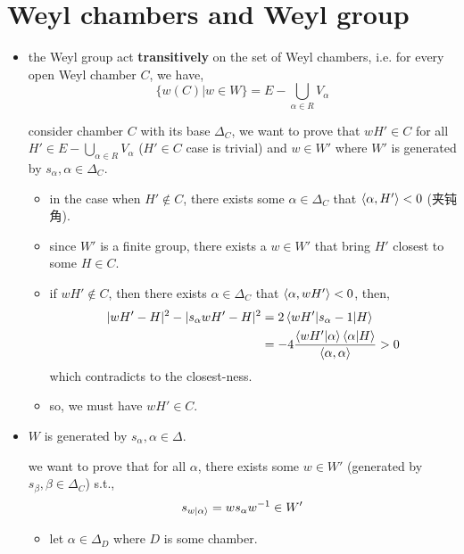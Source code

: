 \section{Weyl chambers and Weyl group} \label{7.5}
\begin{itemize}
	\item the Weyl group act \textbf{transitively} on the set of Weyl chambers, i.e. for every open Weyl chamber $C$, we have,
	\begin{equation}
		\{w(C) | w \in W\} = E - \bigcup_{\alpha \in R} V_\alpha
	\end{equation}
	
	\begin{tcolorbox}[title=proof:]
		consider chamber $C$ with its base $\Delta_C$, we want to prove that $w H' \in C$ for all $H' \in E - \bigcup_{\alpha \in R} V_\alpha$ ($H' \in C$ case is trivial) and $w \in W'$ where $W'$ is generated by $s_\alpha, \alpha \in \Delta_C$.
		\begin{itemize}
			\item in the case when $H' \notin C$, there exists some $\alpha \in \Delta_C$ that $\braket{\alpha, H'} < 0$ (夹钝角).
			
			\item since $W'$ is a finite group, there exists a $w \in W'$ that bring $H'$ closest to some $H \in C$.
			
			\item if $w H' \notin C$, then there exists $\alpha \in \Delta_C$ that $\braket{\alpha, w H'} < 0$, then,
			\begin{align}
				|w H' - H|^2 - |s_\alpha w H' - H|^2 &= 2 \braket{w H' | s_\alpha - 1 | H} \notag \\
				&= - 4 \frac{\braket{w H' | \alpha} \braket{\alpha | H}}{\braket{\alpha, \alpha}} > 0
			\end{align}
			which contradicts to the closest-ness.
			
			\item so, we must have $w H' \in C$.
		\end{itemize}
	\end{tcolorbox}
	
	\item $W$ is generated by $s_\alpha, \alpha \in \Delta$.
	
	\begin{tcolorbox}[title=proof:]
		we want to prove that for all $\alpha$, there exists some $w \in W'$ (generated by $s_\beta, \beta \in \Delta_C$) s.t.,
		\begin{equation}
			s_{w \ket{\alpha}} = w s_\alpha w^{- 1} \in W'
		\end{equation}
		\begin{itemize}
			\item let $\alpha \in \Delta_D$ where $D$ is some chamber.
			

\end{itemize}
\end{tcolorbox}
\end{itemize}
